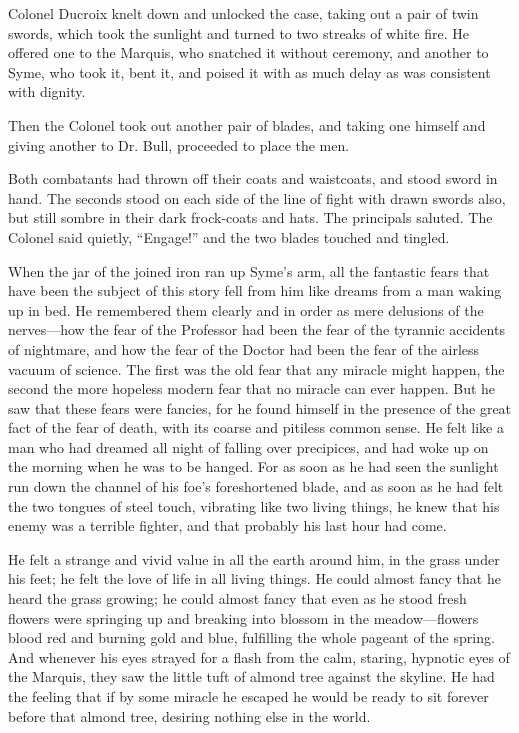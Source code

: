 Colonel Ducroix knelt down and unlocked the case, taking out a pair of twin swords, which took the sunlight and turned to two streaks of white fire. He offered one to the Marquis, who snatched it without ceremony, and another to Syme, who took it, bent it, and poised it with as much delay as was consistent with dignity.

Then the Colonel took out another pair of blades, and taking one himself and giving another to Dr. Bull, proceeded to place the men.

Both combatants had thrown off their coats and waistcoats, and stood sword in hand. The seconds stood on each side of the line of fight with drawn swords also, but still sombre in their dark frock-coats and hats. The principals saluted. The Colonel said quietly, “Engage!” and the two blades touched and tingled.

When the jar of the joined iron ran up Syme’s arm, all the fantastic fears that have been the subject of this story fell from him like dreams from a man waking up in bed. He remembered them clearly and in order as mere delusions of the nerves⁠—how the fear of the Professor had been the fear of the tyrannic accidents of nightmare, and how the fear of the Doctor had been the fear of the airless vacuum of science. The first was the old fear that any miracle might happen, the second the more hopeless modern fear that no miracle can ever happen. But he saw that these fears were fancies, for he found himself in the presence of the great fact of the fear of death, with its coarse and pitiless common sense. He felt like a man who had dreamed all night of falling over precipices, and had woke up on the morning when he was to be hanged. For as soon as he had seen the sunlight run down the channel of his foe’s foreshortened blade, and as soon as he had felt the two tongues of steel touch, vibrating like two living things, he knew that his enemy was a terrible fighter, and that probably his last hour had come.

He felt a strange and vivid value in all the earth around him, in the grass under his feet; he felt the love of life in all living things. He could almost fancy that he heard the grass growing; he could almost fancy that even as he stood fresh flowers were springing up and breaking into blossom in the meadow⁠—flowers blood red and burning gold and blue, fulfilling the whole pageant of the spring. And whenever his eyes strayed for a flash from the calm, staring, hypnotic eyes of the Marquis, they saw the little tuft of almond tree against the skyline. He had the feeling that if by some miracle he escaped he would be ready to sit forever before that almond tree, desiring nothing else in the world.

